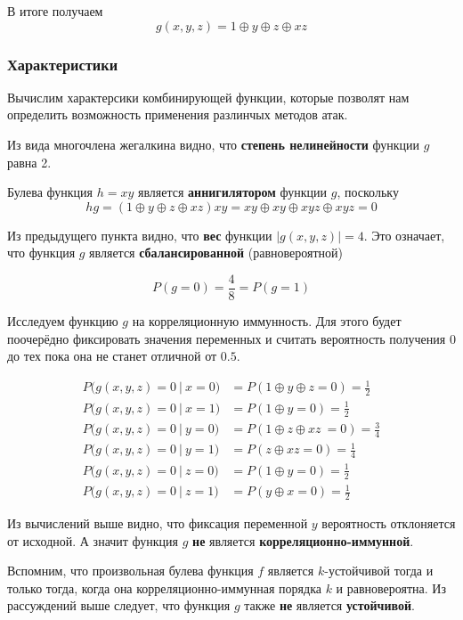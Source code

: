\documentclass[a4paper,12pt]{article}
\theoremstyle{definition}
\begin{document}
	В итоге получаем 	
	\[ g(x,y,z) = 1 \oplus y \oplus z \oplus x z\]
	
	

	\subsubsection{Характеристики} \label{Характеристики}
	
	Вычислим характерсики комбинирующей функции, которые позволят нам определить возможность применения разлинчых методов атак.
	
	Из вида многочлена жегалкина видно, что \textbf{степень нелинейности} функции $g$ равна 2. 
	
	Булева функция $h = x y$ является \textbf{аннигилятором} функции $g$, поскольку
	\[ h g = \left(1 \oplus y \oplus z \oplus x z \right) xy = xy \oplus xy \oplus xyz \oplus xyz = 0 \]

	Из предыдущего пункта видно, что \textbf{вес} функции $|g(x,y,z)| = 4$. Это означает, что функция $g$ является \textbf{сбалансированной} (равновероятной)
	
	\[ P(g = 0) = \frac{4}{8} = P(g = 1) \]

	Исследуем функцию $g$ на корреляционную иммунность. Для этого будет поочерёдно фиксировать значения переменных и считать вероятность получения $0$ до тех пока она не станет отличной от $0.5$.
	
	\begin{align*}
		P\bigl( g(x,y,z) = 0\ |\ x = 0\bigr) &= P(1\oplus y \oplus z = 0) = \frac{1}{2} \\ 
		P\bigl( g(x,y,z) = 0\ |\ x = 1\bigr) &= P(1\oplus y = 0) = \frac{1}{2} \\[2ex]
		P\bigl( g(x,y,z) = 0\ |\ y = 0\bigr) &= P(1 \oplus z \oplus x z\ = 0) = \frac{3}{4} \\ 
		P\bigl( g(x,y,z) = 0\ |\ y = 1\bigr) &= P(z \oplus x z = 0) = \frac{1}{4} \\[2ex]
		P\bigl( g(x,y,z) = 0\ |\ z = 0\bigr) &= P(1 \oplus y = 0) = \frac{1}{2} \\ 
		P\bigl( g(x,y,z) = 0\ |\ z = 1\bigr) &= P(y \oplus x = 0) = \frac{1}{2} 
	\end{align*}
	
	Из вычислений выше видно, что фиксация переменной $y$ вероятность отклоняется от исходной. А значит функция $g$ \textbf{не} является \textbf{корреляционно-иммунной}.

	Вспомним, что произвольная булева функция $f$ является $k$-устойчивой тогда и только тогда, когда она корреляционно-иммунная порядка $k$ и равновероятна. Из рассуждений выше следует, что функция $g$ также \textbf{не} является \textbf{устойчивой}.
	
\end{document}
